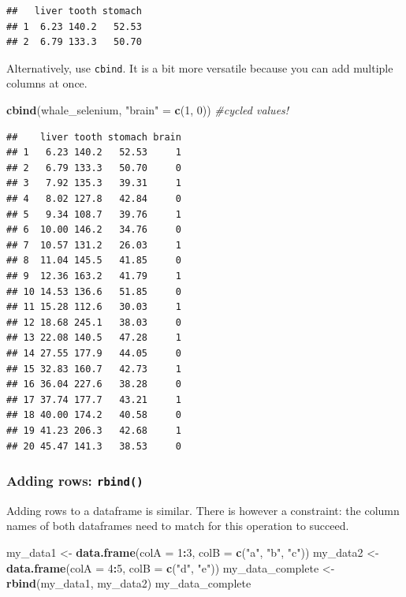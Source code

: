 \documentclass[]{book}
\newenvironment{Shaded}{\begin{snugshade}}{\end{snugshade}}
\newcommand{\CommentTok}[1]{\textcolor[rgb]{0.56,0.35,0.01}{\textit{#1}}}
\newcommand{\DataTypeTok}[1]{\textcolor[rgb]{0.13,0.29,0.53}{#1}}
\newcommand{\DecValTok}[1]{\textcolor[rgb]{0.00,0.00,0.81}{#1}}
\newcommand{\KeywordTok}[1]{\textcolor[rgb]{0.13,0.29,0.53}{\textbf{#1}}}
\newcommand{\NormalTok}[1]{#1}
\newcommand{\OperatorTok}[1]{\textcolor[rgb]{0.81,0.36,0.00}{\textbf{#1}}}
\newcommand{\StringTok}[1]{\textcolor[rgb]{0.31,0.60,0.02}{#1}}
\begin{document}
\begin{verbatim}
##   liver tooth stomach
## 1  6.23 140.2   52.53
## 2  6.79 133.3   50.70
\end{verbatim}

Alternatively, use \texttt{cbind}. It is a bit more versatile because you can add multiple columns at once.

\begin{Shaded}
\begin{Highlighting}[]
\KeywordTok{cbind}\NormalTok{(whale_selenium, }\StringTok{"brain"}\NormalTok{ =}\StringTok{ }\KeywordTok{c}\NormalTok{(}\DecValTok{1}\NormalTok{, }\DecValTok{0}\NormalTok{)) }\CommentTok{#cycled values!}
\end{Highlighting}
\end{Shaded}

\begin{verbatim}
##    liver tooth stomach brain
## 1   6.23 140.2   52.53     1
## 2   6.79 133.3   50.70     0
## 3   7.92 135.3   39.31     1
## 4   8.02 127.8   42.84     0
## 5   9.34 108.7   39.76     1
## 6  10.00 146.2   34.76     0
## 7  10.57 131.2   26.03     1
## 8  11.04 145.5   41.85     0
## 9  12.36 163.2   41.79     1
## 10 14.53 136.6   51.85     0
## 11 15.28 112.6   30.03     1
## 12 18.68 245.1   38.03     0
## 13 22.08 140.5   47.28     1
## 14 27.55 177.9   44.05     0
## 15 32.83 160.7   42.73     1
## 16 36.04 227.6   38.28     0
## 17 37.74 177.7   43.21     1
## 18 40.00 174.2   40.58     0
## 19 41.23 206.3   42.68     1
## 20 45.47 141.3   38.53     0
\end{verbatim}

\hypertarget{adding-rows-rbind}{%
\subsubsection*{\texorpdfstring{Adding rows: \texttt{rbind()}}{Adding rows: rbind()}}\label{adding-rows-rbind}}

Adding rows to a dataframe is similar. There is however a constraint: the column names of both dataframes need to match for this operation to succeed.

\begin{Shaded}
\begin{Highlighting}[]
\NormalTok{my_data1 <-}\StringTok{ }\KeywordTok{data.frame}\NormalTok{(}\DataTypeTok{colA =} \DecValTok{1}\OperatorTok{:}\DecValTok{3}\NormalTok{, }\DataTypeTok{colB =} \KeywordTok{c}\NormalTok{(}\StringTok{"a"}\NormalTok{, }\StringTok{"b"}\NormalTok{, }\StringTok{"c"}\NormalTok{))}
\NormalTok{my_data2 <-}\StringTok{ }\KeywordTok{data.frame}\NormalTok{(}\DataTypeTok{colA =} \DecValTok{4}\OperatorTok{:}\DecValTok{5}\NormalTok{, }\DataTypeTok{colB =} \KeywordTok{c}\NormalTok{(}\StringTok{"d"}\NormalTok{, }\StringTok{"e"}\NormalTok{))}
\NormalTok{my_data_complete <-}\StringTok{ }\KeywordTok{rbind}\NormalTok{(my_data1, my_data2)}
\NormalTok{my_data_complete}
\end{Highlighting}
\end{Shaded}
\end{document}
